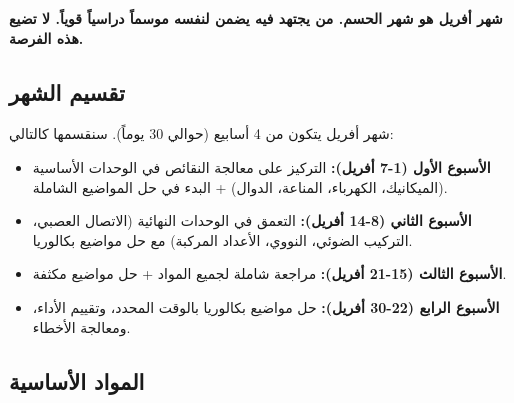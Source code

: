 \documentclass[12pt,a4paper]{book}
\newcommand{\importantAr}[1]{%
	\begin{important}
		\bfseries #1
	\end{important}
}
\begin{document}
	\importantAr{شهر أفريل هو شهر الحسم. من يجتهد فيه يضمن لنفسه موسماً دراسياً قوياً. لا تضيع هذه الفرصة.}
	
	\subsection{تقسيم الشهر}
	شهر أفريل يتكون من 4 أسابيع (حوالي 30 يوماً). سنقسمها كالتالي:
	\begin{itemize}
		\item \textbf{الأسبوع الأول (1-7 أفريل):} التركيز على معالجة النقائص في الوحدات الأساسية (الميكانيك، الكهرباء، المناعة، الدوال) + البدء في حل المواضيع الشاملة.
		\item \textbf{الأسبوع الثاني (8-14 أفريل):} التعمق في الوحدات النهائية (الاتصال العصبي، التركيب الضوئي، النووي، الأعداد المركبة) مع حل مواضيع بكالوريا.
		\item \textbf{الأسبوع الثالث (15-21 أفريل):} مراجعة شاملة لجميع المواد + حل مواضيع مكثفة.
		\item \textbf{الأسبوع الرابع (22-30 أفريل):} حل مواضيع بكالوريا بالوقت المحدد، وتقييم الأداء، ومعالجة الأخطاء.
	\end{itemize}
	
	\subsection{المواد الأساسية}
	
\end{document}
